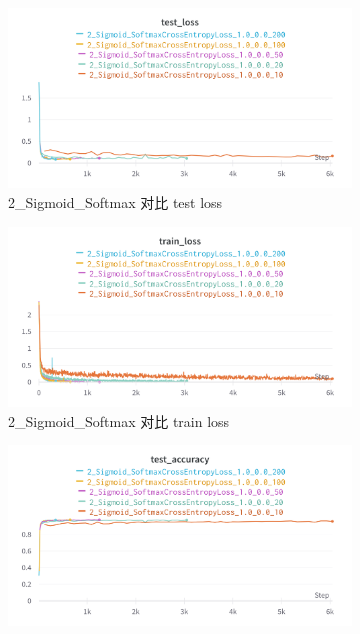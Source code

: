 \documentclass{article}
\begin{document}
\begin{figure}[htbp]
	\centering
	\begin{subfigure}{0.475\textwidth}
		\centering
		\includegraphics[width=1\textwidth]{../pics/批量大小_2_Sigmoid_Softmax_test_loss.png}
		\caption{2\_Sigmoid\_Softmax 对比 test loss}
	\end{subfigure}
	\begin{subfigure}{0.475\textwidth}
		\centering
		\includegraphics[width=1\textwidth]{../pics/批量大小_2_Sigmoid_Softmax_train_loss.png}
		\caption{2\_Sigmoid\_Softmax 对比 train loss}
	\end{subfigure}
	\begin{subfigure}{0.475\textwidth}
		\centering
		\includegraphics[width=1\textwidth]{../pics/批量大小_2_Sigmoid_Softmax_test_acc.png}

\end{subfigure}
\end{figure}
\end{document}
